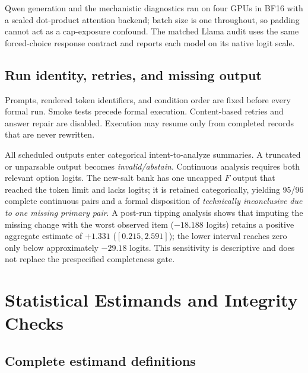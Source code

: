\documentclass[letterpaper]{article}
\begin{document}
Qwen generation and the mechanistic diagnostics ran on four GPUs in BF16 with a scaled dot-product attention backend; batch size is one throughout, so padding cannot act as a cap-exposure confound. The matched Llama audit uses the same forced-choice response contract and reports each model on its native logit scale.

\subsection{Run identity, retries, and missing output}

Prompts, rendered token identifiers, and condition order are fixed before every formal run.  Smoke tests precede formal execution.  Content-based retries and answer repair are disabled.  Execution may resume only from completed records that are never rewritten.

All scheduled outputs enter categorical intent-to-analyze summaries.  A truncated or unparsable output becomes \emph{invalid/abstain}.  Continuous analysis requires both relevant option logits.  The new-salt bank has one uncapped $F$ output that reached the token limit and lacks logits; it is retained categorically, yielding 95/96 complete continuous pairs and a formal disposition of \emph{technically inconclusive due to one missing primary pair}.  A post-run tipping analysis shows that imputing the missing change with the worst observed item ($-18.188$ logits) retains a positive aggregate estimate of $+1.331$ ($[0.215,2.591]$); the lower interval reaches zero only below approximately $-29.18$ logits.  This sensitivity is descriptive and does not replace the prespecified completeness gate.

\section{Statistical Estimands and Integrity Checks}
\label{supp:inference}

\subsection{Complete estimand definitions}
\end{document}
